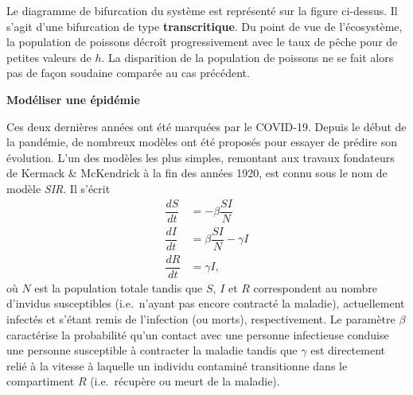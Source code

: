\documentclass[12pt, answers]{exam}
\begin{document}
\begin{questions}
\begin{parts}
    \begin{solution}
      {\color{blue}
        Le diagramme de bifurcation du système est représenté sur la figure ci-dessus.
        Il s'agit d'une bifurcation de type \textbf{transcritique}.
        Du point de vue de l'écosystème, la population de poissons décroît progressivement avec le taux de pêche pour de petites valeurs de $h$.
        La disparition de la population de poissons ne se fait alors pas de façon soudaine comparée au cas précédent.
      }
    \end{solution}

  \end{parts}
  \addpoints

  \question[10] \textbf{Modéliser une épidémie}
  \noaddpoints

  Ces deux dernières années ont été marquées par le COVID-19.
  Depuis le début de la pandémie, de nombreux modèles ont été proposés pour essayer de prédire son évolution.
  L'un des modèles les plus simples, remontant aux travaux fondateurs de Kermack \& McKendrick à la fin des années 1920, est connu sous le nom de modèle \emph{SIR}.
  Il s'écrit
  \[
  \begin{aligned}
    \dfrac{dS}{dt} & = - \beta \dfrac{SI}{N} \\
    \dfrac{dI}{dt} & = \beta \dfrac{SI}{N} - \gamma I \\
    \dfrac{dR}{dt} & = \gamma I,
  \end{aligned}
  \]
  où $N$ est la population totale tandis que $S$, $I$ et $R$ correspondent au nombre d'invidus susceptibles (i.e.\ n'ayant pas encore contracté la maladie), actuellement infectés et s'étant remis de l'infection (ou morts), respectivement.
  Le paramètre $\beta$ caractérise la probabilité qu'un contact avec une personne infectieuse conduise une personne susceptible à contracter la maladie tandis que $\gamma$ est directement relié à la vitesse à laquelle un individu contaminé transitionne dans le compartiment $R$ (i.e.\ récupère ou meurt de la maladie).

\end{questions}
\end{document}
